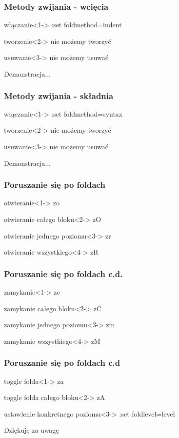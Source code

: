 \documentclass{beamer}
\begin{document}
\begin{frame}
	\frametitle{Metody zwijania - wcięcia}
	\begin{block}{włączanie}<1->
	:set foldmethod=indent
	\end{block}
	\begin{block}{tworzenie}<2->
	nie możemy tworzyć
	\end{block}
	\begin{block}{usuwanie}<3->
	nie możemy usuwać
	\end{block}
	{
		Demonstracja...
	}
\end{frame}
\begin{frame}
	\frametitle{Metody zwijania - składnia}
	\begin{block}{włączanie}<1->
	:set foldmethod=syntax
	\end{block}
	\begin{block}{tworzenie}<2->
	nie możemy tworzyć
	\end{block}
	\begin{block}{usuwanie}<3->
	nie możemy usuwać
	\end{block}
	{
		Demonstracja...
	}
\end{frame}
\begin{frame}
	\frametitle{Poruszanie się po foldach}
	\begin{block}{otwieranie}<1->
	zo
	\end{block}
	\begin{block}{otwieranie całego bloku}<2->
	zO
	\end{block}
	\begin{block}{otwieranie jednego poziomu}<3->
	zr
	\end{block}
	\begin{block}{otwieranie wszystkiego}<4->
	zR
	\end{block}
\end{frame}
\begin{frame}
	\frametitle{Poruszanie się po foldach c.d.}
	\begin{block}{zamykanie}<1->
	zc
	\end{block}
	\begin{block}{zamykanie całego bloku}<2->
	zC
	\end{block}
	\begin{block}{zamykanie jednego poziomu}<3->
	zm
	\end{block}
	\begin{block}{zamykanie wszystkiego}<4->
	zM
	\end{block}
\end{frame}
\begin{frame}
	\frametitle{Poruszanie się po foldach c.d}
	\begin{block}{toggle folda}<1->
	za
	\end{block}
	\begin{block}{toggle folda całego bloku}<2->
	zA
	\end{block}
	\begin{block}{ustawienie konkretnego poziomu}<3->
	:set foldlevel=level
	\end{block}
\end{frame}
\begin{frame}
	Dziękuję za uwagę
\end{frame}
\end{document}
